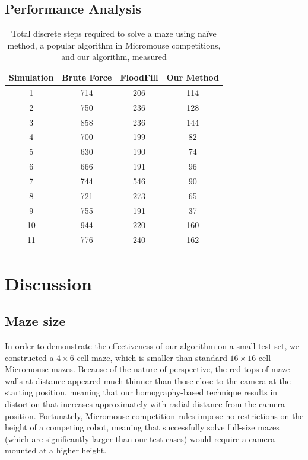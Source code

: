 \documentclass[10pt,twocolumn,letterpaper]{article}
\begin{document}


\subsection{Performance Analysis} %
\label{sub:performance_analysis}

\begin{table}[!h]
	\centering
	\begin{tabular}{|c|c|c|c|}
		\hline
		\textbf{Simulation} & \textbf{Brute Force} & \textbf{FloodFill} & \textbf{Our Method} \\ \hline
		1 & 714 & 206 & 114 \\ \hline
		2 & 750 & 236 & 128 \\ \hline
		3 & 858 & 236 & 144 \\ \hline
		4 & 700 & 199 & 82 \\ \hline
		5 & 630 & 190 & 74 \\ \hline
		6 & 666 & 191 & 96 \\ \hline
		7 & 744 & 546 & 90 \\ \hline
		8 & 721 & 273 & 65 \\ \hline
		9 & 755 & 191 & 37 \\ \hline
		10 & 944 & 220 & 160 \\ \hline
		11 & 776 & 240 & 162 \\ \hline
	\end{tabular}
	\caption{Total discrete steps required to solve a maze using na\"{i}ve method, a popular algorithm in Micromouse competitions, and our algorithm, measured }
	\label{tab:performance}
\end{table}

\section{Discussion}
\label{sec:discussion}

\subsection{Maze size} %
\label{sub:maze_size}

In order to demonstrate the effectiveness of our algorithm on a small test set, we constructed a $4\times 6$-cell maze,
which is smaller than standard $16\times 16$-cell Micromouse mazes.  Because of the nature of perspective, the red tops
of maze walls at distance appeared much thinner than those close to the camera at the starting position, meaning that
our homography-based technique results in distortion that increases approximately with radial distance from the camera
position.  Fortunately, Micromouse competition rules impose no restrictions on the height of a competing robot, meaning
that successfully solve full-size mazes (which are significantly larger than our test cases) would require a camera
mounted at a higher height.
\end{document}
